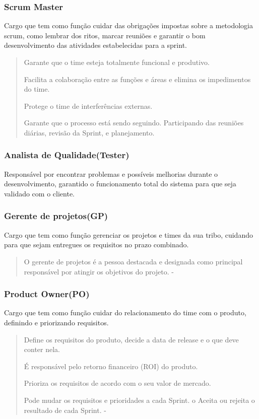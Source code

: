 \subsubsection{Scrum Master}

Cargo que tem como função cuidar das obrigações impostas sobre a metodologia scrum, como lembrar dos ritos, marcar reuniões e garantir o bom desenvolvimento das atividades estabelecidas para a sprint.

\begin{quote}
Garante que o time esteja
totalmente funcional e
produtivo.

Facilita a colaboração entre as
funções e áreas e elimina os
impedimentos do time.

Protege o time de
interferências externas.

Garante que o processo está
sendo seguindo. Participando
das reuniões diárias, revisão
da Sprint, e planejamento. \cite{sabbagh2014scrum}

\end{quote}

\subsubsection{Analista de Qualidade(Tester)}

Responsável por encontrar problemas e possíveis melhorias durante o desenvolvimento, garantido o funcionamento total do sistema para que seja validado com o cliente.

\subsubsection{Gerente de projetos(GP)}

Cargo que tem como função gerenciar os projetos e times da sua
 tribo, cuidando para que sejam entregues os requisitos no prazo combinado.

\begin{quote}
  O gerente de projetos é a pessoa destacada e designada como principal responsável por atingir os objetivos do projeto. - \cite{cruz2013scrum}
\end{quote}
\subsubsection{Product Owner(PO)}
\label{sec:po}
Cargo que tem como função cuidar do relacionamento do time com o produto,
 definindo e priorizando requisitos.
 
 \begin{quote}
  Define os requisitos do
  produto, decide a data de
  release e o que deve conter
  nela.

  É responsável pelo retorno
  financeiro (ROI) do produto.
  
  Prioriza os requisitos de
  acordo com o seu valor de
  mercado.
  
  Pode mudar os requisitos e
  prioridades a cada Sprint.
  o Aceita ou rejeita o resultado de
  cada Sprint. - \cite{sabbagh2014scrum}
 \end{quote}

